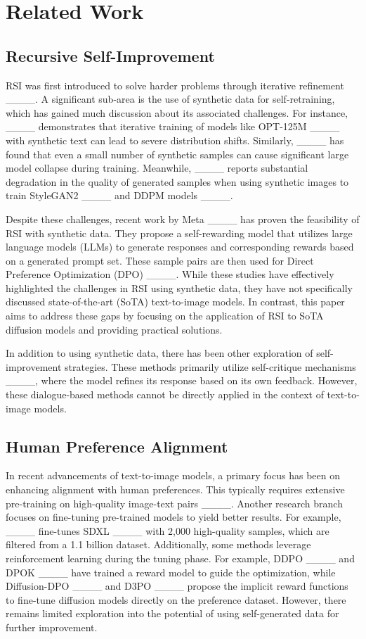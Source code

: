 \section{Related Work}
\subsection{Recursive Self-Improvement}
RSI was first introduced to solve harder problems through iterative refinement ____.
%
A significant sub-area is the use of synthetic data for self-retraining, which has gained much discussion about its associated challenges.
%
For instance, ____ demonstrates that iterative training of models like OPT-125M ____ with synthetic text can lead to severe distribution shifts.
%
Similarly, ____ has found that even a small number of synthetic samples can cause significant large model collapse during training.
%
Meanwhile, ____ reports substantial degradation in the quality of generated samples when using synthetic images to train StyleGAN2 ____ and DDPM models ____.

Despite these challenges, recent work by Meta ____ has proven the feasibility of RSI with synthetic data. They propose a self-rewarding model that utilizes large language models (LLMs) to generate responses and corresponding rewards based on a generated prompt set. These sample pairs are then used for Direct Preference Optimization (DPO) ____.
%
While these studies have effectively highlighted the challenges in RSI using synthetic data, they have not specifically discussed state-of-the-art (SoTA) text-to-image models.
%
In contrast, this paper aims to address these gaps by focusing on the application of RSI to SoTA diffusion models and providing practical solutions.

In addition to using synthetic data, there has been other exploration of self-improvement strategies. 
%
These methods primarily utilize self-critique mechanisms ____, where the model refines its response based on its own feedback. 
%
However, these dialogue-based methods cannot be directly applied in the context of text-to-image models.

\subsection{Human Preference Alignment}
In recent advancements of text-to-image models, a primary focus has been on enhancing alignment with human preferences. 
%
This typically requires extensive pre-training on high-quality image-text pairs ____.
%
Another research branch focuses on fine-tuning pre-trained models to yield better results.
%
For example, ____ fine-tunes SDXL ____ with 2,000 high-quality samples, which are filtered from a 1.1 billion dataset.
%
Additionally, some methods leverage reinforcement learning during the tuning phase. 
%
For example, DDPO ____ and DPOK ____ have trained a reward model to guide the optimization, while Diffusion-DPO ____ and D3PO ____ propose the implicit reward functions to fine-tune diffusion models directly on the preference dataset.
%
However, there remains limited exploration into the potential of using self-generated data for further improvement.

